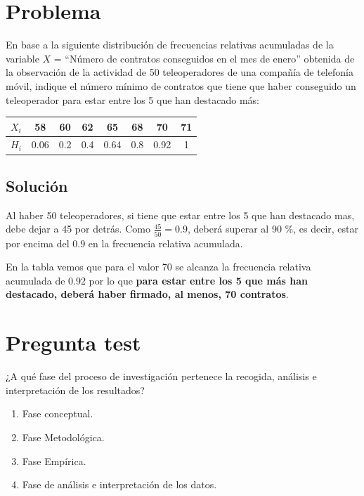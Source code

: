 \documentclass[
]{book}
\providecommand{\tightlist}{%
  \setlength{\itemsep}{0pt}\setlength{\parskip}{0pt}}
\begin{document}
\hypertarget{problema-1}{%
\section{Problema}\label{problema-1}}

En base a la siguiente distribución de frecuencias relativas acumuladas de la variable \(X\) = ``Número de contratos conseguidos en el mes de enero'' obtenida de la observación de la actividad de 50 teleoperadores de
una compañía de telefonía móvil, indique el número mínimo de contratos que tiene que haber conseguido un teleoperador para estar entre los 5 que han destacado más:

\begin{longtable}[]{@{}cccccccc@{}}
\toprule
\(X_i\) & 58 & 60 & 62 & 65 & 68 & 70 & 71\tabularnewline
\midrule
\endhead
\(H_i\) & 0.06 & 0.2 & 0.4 & 0.64 & 0.8 & 0.92 & 1\tabularnewline
\bottomrule
\end{longtable}

\hypertarget{soluciuxf3n-1}{%
\subsection{Solución}\label{soluciuxf3n-1}}

Al haber 50 teleoperadores, si tiene que estar entre los 5 que han destacado mas, debe dejar a 45 por detrás. Como \(\frac{45}{50}=0.9\), deberá superar al 90 \%, es decir, estar por encima del 0.9 en la frecuencia relativa acumulada.

En la tabla vemos que para el valor 70 se alcanza la frecuencia relativa acumulada de 0.92 por lo que \textbf{para estar entre los 5 que más han destacado, deberá haber firmado, al menos, 70 contratos}.

\hypertarget{pregunta-test-6}{%
\section{Pregunta test}\label{pregunta-test-6}}

¿A qué fase del proceso de investigación pertenece la recogida, análisis e interpretación de los resultados?

\begin{enumerate}
\def\labelenumi{\alph{enumi})}
\tightlist
\item
  Fase conceptual.
\item
  Fase Metodológica.
\item
  Fase Empírica.
\item
  Fase de análisis e interpretación de los datos.
\end{enumerate}
\end{document}
